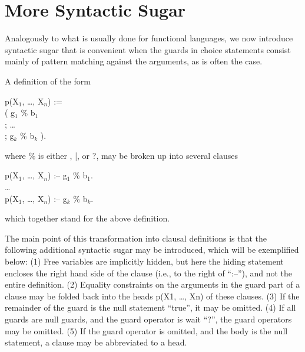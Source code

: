 \section{More Syntactic Sugar}

Analogously to what is usually done for functional languages, we now
introduce syntactic sugar that is convenient when the guards in choice
statements consist mainly of pattern matching against the arguments,
as is often the case.

A definition of the form
%
\begin{program}
p(X$_1$, \dots, X$_n$) := \\
\>\>( g$_1$ \% b$_1$ \\
\>\>; \dots \\
\>\>; g$_k$ \% b$_k$ ).
\end{program}%
%
where {\prog \%} is either {\prog \cond}, {\prog |}, or {\prog ?}, may
be broken up into several clauses
%
\begin{program}
p(X$_1$, \dots, X$_n$) :-- g$_1$ \% b$_1$.  \\
\dots \\
p(X$_1$, \dots, X$_n$) :-- g$_k$ \% b$_k$.
\end{program}%
%
which together stand for the above definition.

The main point of this transformation into clausal definitions is that
the following additional syntactic sugar may be introduced, which will
be exemplified below: (1) Free variables are implicitly hidden, but
here the hiding statement encloses the right hand side of the clause
(i.e., to the right of ``{\prog :--}''), and not the entire
definition.  (2) Equality constraints on the arguments in the guard
part of a clause may be folded back into the heads {\prog p(X1, \dots,
Xn)} of these clauses.  (3) If the remainder of the guard is the null
statement ``{\prog true}'', it may be omitted.  (4) If all guards are null
guards, and the guard operator is wait ``{\prog ?}'', the guard operators may
be omitted.  (5) If the guard operator is omitted, and the body is the
null statement, a clause may be abbreviated to a head.

